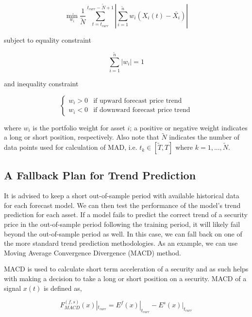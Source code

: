 \documentclass{article}
\begin{document}
\begin{equation}\label{eqn:mad-optimization-problem}
\min_{w_{i}} \frac{1}{\tilde{N}}\sum_{t=t_{curr}}^{t_{curr}-\tilde{N}+1}
|\sum_{i=1}^{\tilde{n}} w_{i} (X_{i}(t)-\bar{X_{i}})|
\end{equation}

subject to equality constraint

\begin{equation}\label{eqn:mad-sum-constraint}
\sum_{i=1}^{\tilde{n}} |w_{i}| = 1
\end{equation}

and inequality constraint

\[
\begin{cases}\label{eqn:mad-trend-constraint}
    w_{i} > 0 & \text{if upward forecast price trend} \\
    w_{i} < 0 & \text{if downward forecast price trend}
\end{cases}
\]

where $w_{i}$ is the portfolio weight for asset $i$; a positive or
negative weight indicates a long or short position, respectively. Also
note that $\tilde{N}$ indicates the number of data points used for
calculation of MAD, i.e. $t_{k} \in [\tilde{T},T]$ where $k = 1,
...,\tilde{N}$.

\subsection{A Fallback Plan for Trend Prediction}\label{subsection:fallback-macd}

It is advised to keep a short out-of-sample period with available
historical data for each forecast model. We can then test the
performance of the model's trend prediction for each asset. If a model
fails to predict the correct trend of a security price in the
out-of-sample period following the training period, it will likely
fail beyond the out-of-sample period as well. In this case, we can
fall back on one of the more standard trend prediction
methodologies. As an example, we can use Moving Average Convergence
Divergence (MACD) method.

MACD is used to calculate short term acceleration of a security and as
such helps with making a decision to take a long or short position on
a security. MACD of a signal $x(t)$ is defined as,

\begin{equation}\label{eqn:macd}
F_{MACD}^{(f,s)}(x)|_{t_{curr}} = E^{f}(x)|_{t_{curr}} -
E^{s}(x)|_{t_{curr}}
\end{equation}
\end{document}
